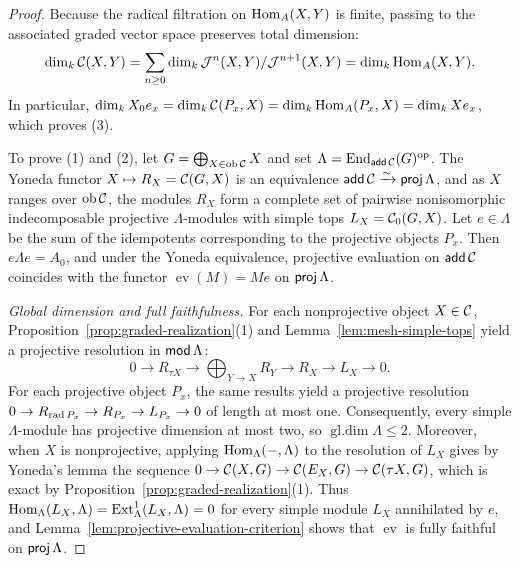\begin{proof}
Because the radical filtration on $\operatorname{Hom}_A(X,Y)$ is finite, passing to the
associated graded vector space preserves total dimension:
\begin{equation}
 \dim_k\mathcal C(X,Y)=\sum_{n\geq0}\dim_k \mathcal J^n(X,Y)/\mathcal J^{n+1}(X,Y)
             =\dim_k\operatorname{Hom}_A(X,Y).
 \label{eq:graded-hom-dimensions}
\end{equation}
In particular, $\dim_k X_0 e_x=\dim_k\mathcal C(P_x,X)=\dim_k\operatorname{Hom}_A(P_x,X)=\dim_k Xe_x$,
which proves (3).

To prove (1) and (2), let $G=\bigoplus_{X\in\operatorname{ob}\mathcal C}X$ and set
$\Lambda=\operatorname{End}_{\operatorname{\mathsf{add}}\mathcal C}(G)^{\mathrm{op}}$. The Yoneda functor $X\mapsto R_X=\mathcal C(G,X)$
is an equivalence $\operatorname{\mathsf{add}}\mathcal C\xrightarrow{\sim}\operatorname{\mathsf{proj}}\Lambda$, and as $X$ ranges
over $\operatorname{ob}\mathcal C$, the modules $R_X$ form a complete set of
pairwise nonisomorphic indecomposable projective $\Lambda$-modules with
simple tops $L_X=\mathcal C_0(G,X)$. Let $e\in\Lambda$ be the sum of the idempotents
corresponding to the projective objects $P_x$. Then $e\Lambda e=A_0$, and
under the Yoneda equivalence, projective evaluation on $\operatorname{\mathsf{add}}\mathcal C$ coincides
with the functor $\operatorname{ev}(M)=Me$ on $\operatorname{\mathsf{proj}}\Lambda$.

\emph{Global dimension and full faithfulness.}
For each nonprojective object $X\in\mathcal C$, Proposition~\ref{prop:graded-realization}(1)
and Lemma~\ref{lem:mesh-simple-tops} yield a projective resolution in
$\operatorname{\mathsf{mod}}\Lambda$:
\[
 0\longrightarrow R_{\tau X}\longrightarrow
 \bigoplus_{Y\to X}R_Y\longrightarrow R_X\longrightarrow L_X
 \longrightarrow0.
\]
For each projective object $P_x$, the same results yield a projective
resolution $0\to R_{\operatorname{rad} P_x}\to R_{P_x}\to L_{P_x}\to0$ of length at most
one. Consequently, every simple $\Lambda$-module has projective dimension at
most two, so $\operatorname{gl.dim}\Lambda\leq2$. Moreover, when $X$ is
nonprojective, applying $\operatorname{Hom}_\Lambda(-,\Lambda)$ to the resolution of $L_X$
gives by Yoneda's lemma the sequence
$0\to\mathcal C(X,G)\to\mathcal C(E_X,G)\to\mathcal C(\tau X,G)$, which is exact by
Proposition~\ref{prop:graded-realization}(1). Thus
$\operatorname{Hom}_\Lambda(L_X,\Lambda)=\operatorname{Ext}^1_\Lambda(L_X,\Lambda)=0$ for every simple
module $L_X$ annihilated by $e$, and Lemma~\ref{lem:projective-evaluation-criterion}
shows that $\operatorname{ev}$ is fully faithful on $\operatorname{\mathsf{proj}}\Lambda$.


\end{proof}

